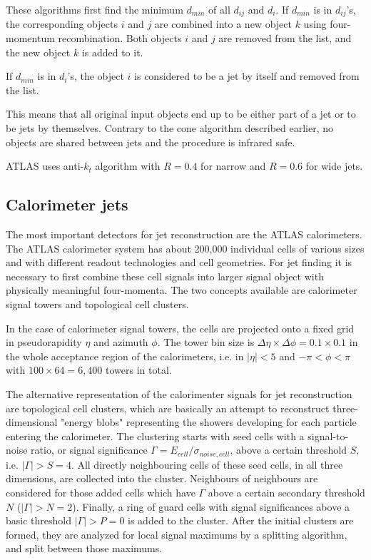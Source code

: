 \documentclass[a4paper,11pt]{report}
\begin{document}
These algorithms first find the minimum $d_{min}$ of all $d_{ij}$ and $d_i$. If
$d_{min}$ is in $d_{ij}$'s, the corresponding objects $i$ and $j$ are combined
into a new object $k$ using four-momentum recombination. Both objects $i$ and
$j$ are removed from the list, and the new object $k$ is added to it.

If $d_{min}$ is in $d_i$'s, the object $i$ is considered to be a jet by itself
and removed from the list.

This means that all original input objects end up to be either part of a jet or
to be jets by themselves. Contrary to the cone algorithm described earlier, no
objects are shared between jets and the procedure is infrared safe.

ATLAS uses anti-$k_t$ algorithm with $R=0.4$ for narrow and $R=0.6$ for wide
jets.

\subsection{Calorimeter jets}

The most important detectors for jet reconstruction are the ATLAS calorimeters.
The ATLAS calorimeter system has about 200,000 individual cells of various sizes
and with different readout technologies and cell geometries. For jet finding it
is necessary to first combine these cell signals into larger signal object with
physically meaningful four-momenta. The two concepts available are calorimeter
signal towers and topological cell clusters.

In the case of calorimeter signal towers, the cells are projected onto a fixed
grid in pseudorapidity $\eta$ and azimuth $\phi$. The tower bin size is $\Delta
\eta \times \Delta \phi = 0.1 \times 0.1$ in the whole acceptance region of the
calorimeters, i.e. in $|\eta| < 5$ and $- \pi < \phi < \pi$ with $100 \times 64
= 6,400$ towers in total.

The alternative representation of the calorimenter signals for jet
reconstruction are topological cell clusters, which are basically an attempt to
reconstruct three-dimensional "energy blobs" representing the showers developing
for each particle entering the calorimeter. The clustering starts with seed
cells with a signal-to-noise ratio, or signal significance $\Gamma = E_{cell} /
\sigma_{noise,cell}$, above a certain threshold $S$, i.e. $|\Gamma| > S = 4$.
All directly neighbouring cells of these seed cells, in all three dimensions,
are collected into the cluster. Neighbours of neighbours are considered for
those added cells which have $\Gamma$ above a certain secondary threshold $N$
($|\Gamma| > N = 2$). Finally, a ring of guard cells with signal significances
above a basic threshold $|\Gamma| > P = 0$ is added to the cluster. After the
initial clusters are formed, they are analyzed for local signal maximums by a
splitting algorithm, and split between those maximums.
\end{document}
